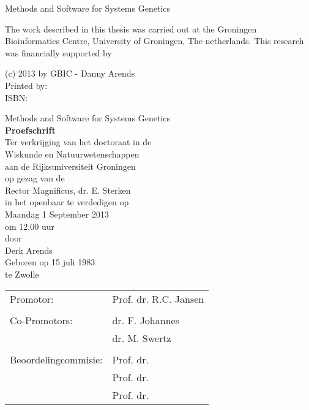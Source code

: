 \documentclass[11pt, twoside, a5paper]{report}
\newcommand{\bold}[1]{{\bfseries #1}}
\newcommand{\mytitle}[1]{{\LARGE #1}}
\begin{document}
  \thispagestyle{empty}
  \begin{center}
  \mytitle{Methods and Software for Systems Genetics}\\
  \end{center}
\newpage
  \thispagestyle{empty}
  \noindent The work described in this thesis was carried out at the Groningen Bioinformatics Centre, University of Groningen, The netherlands.
  This research was financially supported by\\
  \vspace{130 mm}
  
  \noindent (c) 2013 by GBIC - Danny Arends\\
  Printed by:\\
  ISBN:\\
\newpage

\thispagestyle{empty}
\begin{center}
  \mytitle{Methods and Software for Systems Genetics}\\
    \vspace{10 mm}
  \bold{Proefschrift}\\
    \vspace{10 mm}
  Ter verkrijging van het doctoraat in de \\
  Wiskunde en Natuurwetenschappen \\
  aan de Rijksuniversiteit Groningen \\
  op gezag van de \\
  Rector Magnificus, dr. E. Sterken\\ 
  in het openbaar te verdedigen op \\
  Maandag 1 September 2013 \\
  om 12.00 uur \\
    \vspace{10 mm}
  door\\
    \vspace{10 mm}
  Derk Arends\\
    \vspace{10 mm}
  Geboren op 15 juli 1983\\
  te Zwolle
\end{center}

\newpage
\thispagestyle{empty}
\begin{tabular}{ l l }
Promotor:             & Prof. dr. R.C. Jansen \\
                      & \\
Co-Promotors:         & dr. F. Johannes \\
                      & dr. M. Swertz \\
                      & \\
Beoordelingcommisie:  & Prof. dr. \\
                      & Prof. dr. \\
                      & Prof. dr. \\
\end{tabular}
\end{document}
